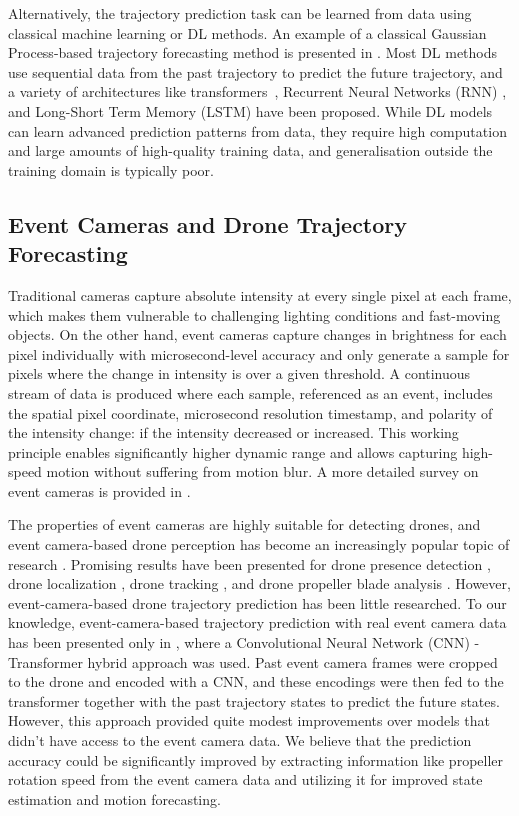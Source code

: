 \documentclass[letterpaper, 10 pt, conference]{ieeeconf}  %
\begin{document}
Alternatively, the trajectory prediction task can be learned from data using classical machine learning or DL methods. An example of a classical Gaussian Process-based trajectory forecasting method is presented in \cite{xie2022efficient}. Most DL methods use sequential data from the past trajectory to predict the future trajectory, and a variety of architectures like transformers~\cite{wang2024enhanced}, Recurrent Neural Networks (RNN) \cite{becker2021generating}, and Long-Short Term Memory (LSTM) \cite{magrini_fred_2025} have been proposed. While DL models can learn advanced prediction patterns from data, they require high computation and large amounts of high-quality training data, and generalisation outside the training domain is typically poor. 

\subsection{Event Cameras and Drone Trajectory Forecasting}\label{subsec:event_based}
Traditional cameras capture absolute intensity at every single pixel at each frame, which makes them vulnerable to challenging lighting conditions and fast-moving objects. On the other hand, event cameras capture changes in brightness for each pixel individually with microsecond-level accuracy and only generate a sample for pixels where the change in intensity is over a given threshold. A continuous stream of data is produced where each sample, referenced as an event, includes the spatial pixel coordinate, microsecond resolution timestamp, and polarity of the intensity change: if the intensity decreased or increased. This working principle enables significantly higher dynamic range and allows capturing high-speed motion without suffering from motion blur. A more detailed survey on event cameras is provided in \cite{gallego_event-based_2022}.

The properties of event cameras are highly suitable for detecting drones, and event camera-based drone perception has become an increasingly popular topic of research \cite{magrini_drone_2025}. Promising results have been presented for drone presence detection \cite{eldeborg2024drone,stewart2022virtual}, drone localization \cite{magrini2024neuromorphic}, drone tracking \cite{iaboni2022event}, and drone propeller blade analysis \cite{zhao2022high,sanket2021evpropnet}. However, event-camera-based drone trajectory prediction has been little researched. To our knowledge, event-camera-based trajectory prediction with real event camera data has been presented only in \cite{magrini_fred_2025}, where a Convolutional Neural Network (CNN) - Transformer hybrid approach was used. Past event camera frames were cropped to the drone and encoded with a CNN, and these encodings were then fed to the transformer together with the past trajectory states to predict the future states. However, this approach provided quite modest improvements over models that didn't have access to the event camera data. We believe that the prediction accuracy could be significantly improved by extracting information like propeller rotation speed from the event camera data and utilizing it for improved state estimation and motion forecasting. 
\end{document}
